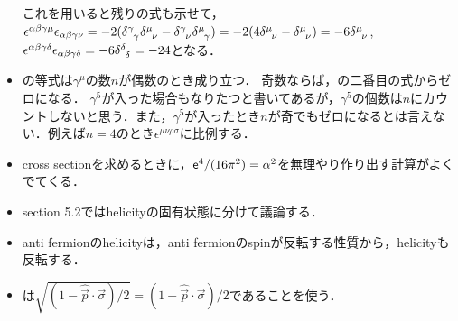 \begin{itemize}
		これを用いると残りの式も示せて，$\epsilon^{\alpha\beta\gamma\mu}\epsilon_{\alpha\beta\gamma\nu} = -2(\delta\indices{^\gamma_\gamma}\delta\indices{^\mu_\nu} - \delta\indices{^\gamma_\nu}\delta\indices{^\mu_\gamma}) = -2(4\delta\indices{^\mu_\nu} - \delta\indices{^\mu_\nu}) = -6\delta\indices{^\mu_\nu}$,
		$\epsilon^{\alpha\beta\gamma\delta}\epsilon_{\alpha\beta\gamma\delta} = -6\delta\indices{^\delta_\delta} = -24$となる．
	\item {}の等式は$\gamma^{\mu}$の数$n$が偶数のとき成り立つ．
		奇数ならば，の二番目の式からゼロになる．
		$\gamma^5$が入った場合もなりたつと書いてあるが，$\gamma^{5}$の個数は$n$にカウントしないと思う．また，$\gamma^5$が入ったとき$n$が奇でもゼロになるとは言えない．例えば$n=4$のとき$\epsilon^{\mu\nu\rho\sigma}$に比例する．
	\item cross sectionを求めるときに，$\mathsf{e}^4/(16\pi^2) = \alpha^2$を無理やり作り出す計算がよくでてくる．
	\item section 5.2ではhelicityの固有状態に分けて議論する．
	\item anti fermionのhelicityは，anti fermionのspinが反転する性質から，helicityも反転する．
	\item {}は$\sqrt{(1-\hat{\vec{p}}\cdot\vec{\sigma})/2} = (1-\hat{\vec{p}}\cdot\vec{\sigma})/2$であることを使う．
		

\end{itemize}
